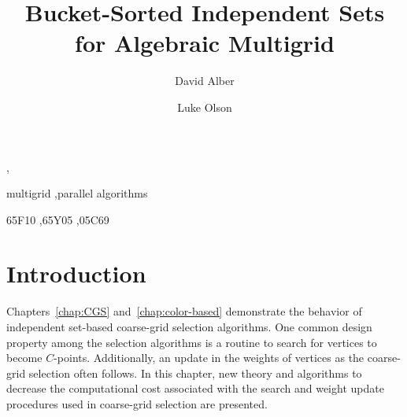 \documentclass{elsart}
\begin{document}
\begin{frontmatter}


\title{Bucket-Sorted Independent Sets for Algebraic Multigrid}
\author[NREL]{David Alber},
\author[UIUC]{Luke Olson}
\address[NREL]{Scientific Computing Center\\ National Renewable Energy Laboratory}
\address[UIUC]{Department of Computer Science\\ University of Illinois at Urbana-Champaign}

\begin{abstract}
\end{abstract}

\begin{keyword}
multigrid \sep parallel algorithms

\MSC 65F10 \sep 65Y05 \sep 05C69
\end{keyword}
\end{frontmatter}


\section{Introduction}
Chapters~\ref{chap:CGS} and~\ref{chap:color-based} demonstrate the
behavior of independent set-based coarse-grid selection
algorithms. One common design property among the selection algorithms
is a routine to search for vertices to become
$C$-points. Additionally, an update in the weights of vertices as the
coarse-grid selection often follows. In this chapter, new theory and
algorithms to decrease the computational cost associated with the
search and weight update procedures used in coarse-grid selection are
presented.
\end{document}
